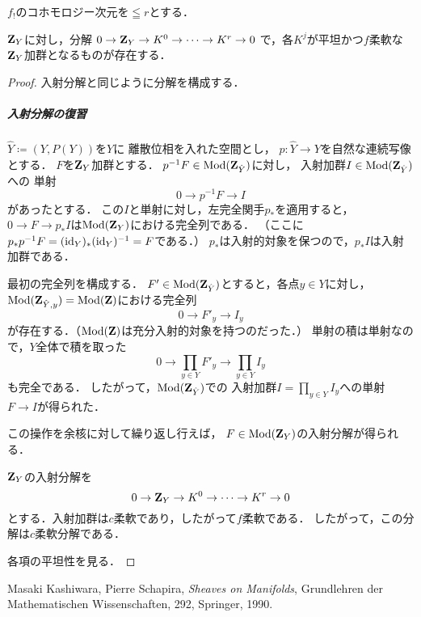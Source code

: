 \(f_!\)のコホモロジー次元を\(\leqq r\)とする．

\begin{LMM}
    \(\mathbf{Z}_Y\)に対し，分解
    \(0\to \mathbf{Z}_Y\to K^0\to\dots\to K^r\to0\)
    で，各\(K^j\)が平坦かつ\(f\)柔軟な\(\mathbf{Z}_Y\)加群となるものが存在する．
\end{LMM}
\begin{proof}
    入射分解と同じように分解を構成する．

    \subparagraph*{入射分解の復習}
    \(\hat{Y}\coloneqq\left(Y,P(Y)\right)\)を\(Y\)に
    離散位相を入れた空間とし，
    \(p\colon \hat{Y}\to Y\)を自然な連続写像とする．
    \(F\)を\(\mathbf{Z}_Y\)加群とする．
    \(p^{-1}F \in\mathop{\mathrm{Mod}}\nolimits(\mathbf{Z}_{\hat{Y}})\)に対し，
    入射加群\(I\in\mathop{\mathrm{Mod}}\nolimits(\mathbf{Z}_{\hat{Y}})\)への
    単射\[0\to p^{-1}F\to I\]があったとする．
    この\(I\)と単射に対し，左完全関手\(p_\ast\)を適用すると，
    \(0\to F\to p_\ast{I}\)は\(\mathop{\mathrm{Mod}}\nolimits(\mathbf{Z}_Y)\)における完全列である．
    （ここに\(p_\ast p^{-1}F=(\mathop{\mathrm{id}}\nolimits_Y)_\ast(\mathop{\mathrm{id}}\nolimits_Y)^{-1}=F\)である．）
    \(p_{\ast}\)は入射的対象を保つので，\(p_\ast{I}\)は入射加群である．

    最初の完全列を構成する．
    \(F'\in\mathop{\mathrm{Mod}}\nolimits(\mathbf{Z}_{\hat{Y}})\)とすると，各点\(y\in Y\)に対し，
    \(\mathop{\mathrm{Mod}}\nolimits(\mathbf{Z}_{\hat{Y},y})=\mathop{\mathrm{Mod}}\nolimits(\mathbf{Z})\)における完全列
    \[
        0\to F'_y\to I_y
    \]が存在する．（\(\mathop{\mathrm{Mod}}\nolimits(\mathbf{Z})\)は充分入射的対象を持つのだった．）
    単射の積は単射なので，\(Y\)全体で積を取った
    \[
        0\to \prod_{y\in Y}F'_y\to \prod_{y\in Y}I_y
    \]
    も完全である．
    したがって，\(\mathop{\mathrm{Mod}}\nolimits(\mathbf{Z}_{\hat{Y}})\)での
    入射加群\(I=\prod_{y\in Y}I_y\)への単射\(F\to I\)が得られた．

    この操作を余核に対して繰り返し行えば，
    \(F\in\mathop{\mathrm{Mod}}\nolimits(\mathbf{Z}_Y)\)の入射分解が得られる．
    
    {}

    \(\mathbf{Z}_Y\)の入射分解を
    \[
        0\to \mathbf{Z}_Y\to K^0\to\cdots\to K^r\to0
    \]
    とする．入射加群は\(c\)柔軟であり，したがって\(f\)柔軟である．
    したがって，この分解は\(c\)柔軟分解である．

    各項の平坦性を見る．
\end{proof}


\begin{thebibliography}{20} 
     Masaki Kashiwara, Pierre Schapira, 
    \textit{Sheaves on Manifolds}, 
    Grundlehren der Mathematischen Wissenschaften, 292, Springer, 1990.
\end{thebibliography}




